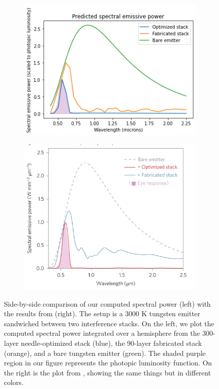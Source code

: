 \documentclass[%
 reprint,
 amsmath,amssymb,
 aps
]{revtex4-2}
\begin{document}
\begin{figure}
\centering
\begin{subfigure}{.25\textwidth}
  \centering
  \includegraphics[width=1.\linewidth]{reproduce_fig_2.pn.png}
  
  \label{fig:sub1}
\end{subfigure}%
\begin{subfigure}{.25\textwidth}
  \centering
  \includegraphics[width=1.\linewidth]{actual_fig_2.png}
  \label{fig:sub2}
\end{subfigure}
\caption{Side-by-side comparison of our computed spectral power (left) with the results from \cite{ilic} (right). The setup is a 3000 K tungsten emitter sandwiched between two interference stacks. On the left, we plot the computed spectral power integrated over a hemisphere from the 300-layer needle-optimized stack (blue), the 90-layer fabricated stack (orange), and a bare tungsten emitter (green). The shaded purple region in our figure represents the photopic luminosity function. On the right is the plot from \cite{ilic}, showing the same things but in different colors.} 
\label{fig_2_reproduce}
\end{figure}
\end{document}
